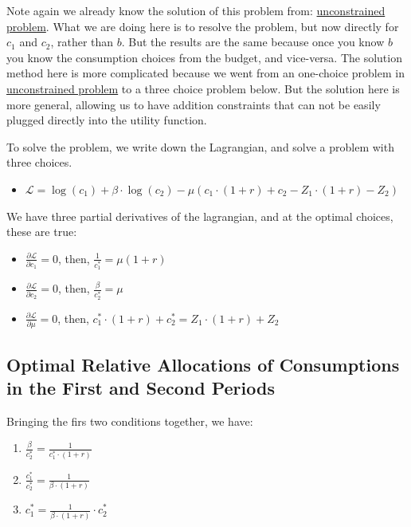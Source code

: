 \documentclass[
]{book}
\providecommand{\tightlist}{%
  \setlength{\itemsep}{0pt}\setlength{\parskip}{0pt}}
\begin{document}
Note again we already know the solution of this problem from:
\href{https://math4econ.github.io/derivative_application/K_save_households.html}{unconstrained
problem}.
What we are doing here is to resolve the problem, but now directly for
\(c_1\) and \(c_2\), rather than \(b\). But the results are the same because
once you know \(b\) you know the consumption choices from the budget, and
vice-versa. The solution method here is more complicated because we went
from an one-choice problem in \href{https://math4econ.github.io/derivative_application/K_save_households.html}{unconstrained
problem}
to a three choice problem below. But the solution here is more general,
allowing us to have addition constraints that can not be easily plugged
directly into the utility function.

To solve the problem, we write down the Lagrangian, and solve a problem
with three choices.

\begin{itemize}
\tightlist
\item
  \(\displaystyle \mathcal{L}=\log (c_1 )+\beta \cdot \log (c_2 )-\mu \left(c_1 \cdot (1+r)+c_2 -Z_1 \cdot (1+r)-Z_2 \right)\)
\end{itemize}

We have three partial derivatives of the lagrangian, and at the optimal
choices, these are true:

\begin{itemize}
\item
  \(\frac{\partial \mathcal{L}}{\partial c_1 }=0\), then,
  \(\frac{1}{c_1^{\ast } }=\mu (1+r)\)
\item
  \(\frac{\partial \mathcal{L}}{\partial c_2 }=0\), then,
  \(\frac{\beta }{c_2^{\ast } }=\mu\)
\item
  \(\frac{\partial \mathcal{L}}{\partial \mu }=0\), then,
  \(c_1^{\ast } \cdot (1+r)+c_2^{\ast } =Z_1 \cdot (1+r)+Z_2\)
\end{itemize}

\hypertarget{optimal-relative-allocations-of-consumptions-in-the-first-and-second-periods}{%
\subsection{Optimal Relative Allocations of Consumptions in the First and Second Periods}\label{optimal-relative-allocations-of-consumptions-in-the-first-and-second-periods}}

Bringing the firs two conditions together, we have:

\begin{enumerate}
\def\labelenumi{\arabic{enumi}.}
\item
  \(\displaystyle \frac{\beta }{c_2^{\ast } }=\frac{1}{c_1^{\ast } \cdot (1+r)}\)
\item
  \(\displaystyle \frac{c_1^{\ast } }{c_2^{\ast } }=\frac{1}{\beta \cdot (1+r)}\)
\item
  \(\displaystyle c_1^{\ast } =\frac{1}{\beta \cdot (1+r)}\cdot c_2^{\ast }\)
\end{enumerate}
\end{document}
